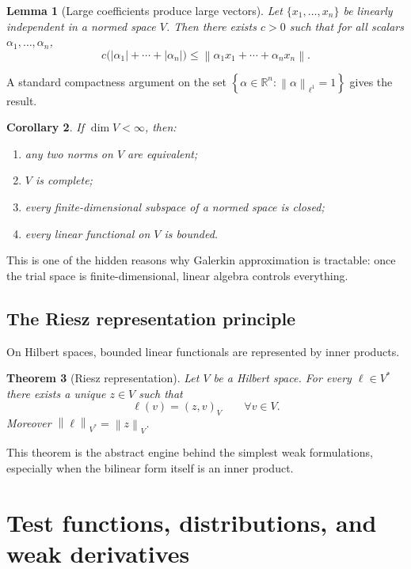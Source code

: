 \documentclass[11pt]{article}
\newtheorem{theorem}{Theorem}[section]
\newtheorem{lemma}[theorem]{Lemma}
\newtheorem{corollary}[theorem]{Corollary}
\theoremstyle{definition}
\newcommand{\R}{\mathbb{R}}
\newcommand{\norm}[1]{\left\lVert #1\right\rVert}
\newcommand{\abs}[1]{\left\lvert #1\right\rvert}
\newcommand{\set}[1]{\left\{ #1\right\}}
\begin{document}
\begin{lemma}[Large coefficients produce large vectors]
Let $\{x_1,\dots,x_n\}$ be linearly independent in a normed space $V$. Then there exists $c>0$ such that for all scalars $\alpha_1,\dots,\alpha_n$,
\[
c\big(\abs{\alpha_1}+\cdots+\abs{\alpha_n}\big)
\le \norm{\alpha_1x_1+\cdots+\alpha_nx_n}.
\]
\end{lemma}

A standard compactness argument on the set $\set{\alpha\in\R^n:\norm{\alpha}_{\ell^1}=1}$ gives the result.

\begin{corollary}
If $\dim V<\infty$, then:
\begin{enumerate}
    \item any two norms on $V$ are equivalent;
    \item $V$ is complete;
    \item every finite-dimensional subspace of a normed space is closed;
    \item every linear functional on $V$ is bounded.
\end{enumerate}
\end{corollary}

This is one of the hidden reasons why Galerkin approximation is tractable: once the trial space is finite-dimensional, linear algebra controls everything.

\subsection{The Riesz representation principle}

On Hilbert spaces, bounded linear functionals are represented by inner products.

\begin{theorem}[Riesz representation]
Let $V$ be a Hilbert space. For every $\ell\in V^*$ there exists a unique $z\in V$ such that
\[
\ell(v) = (z,v)_V \qquad \forall v\in V.
\]
Moreover $\norm{\ell}_{V^*}=\norm{z}_V$.
\end{theorem}

This theorem is the abstract engine behind the simplest weak formulations, especially when the bilinear form itself is an inner product.

\section{Test functions, distributions, and weak derivatives}
\end{document}
